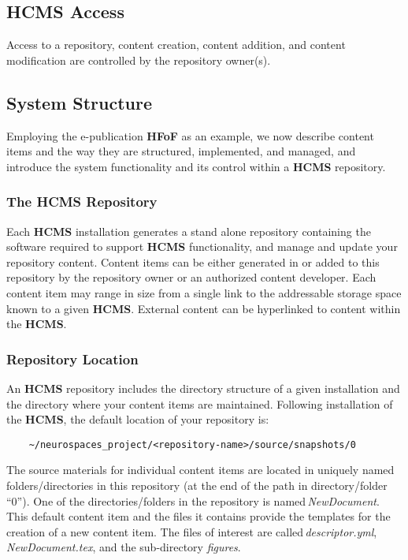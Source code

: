 \documentclass[12pt]{article}
\begin{document}
\subsection{HCMS Access}

Access to a repository, content creation, content addition, and content modification are controlled by the repository owner(s).

\subsection{System Structure}

Employing the e-publication {\bf \small HFoF} as an example, we now describe content items and the way they are structured, implemented, and managed, and introduce the system functionality and its control within a {\bf \small HCMS} repository.

\subsubsection{The HCMS Repository}

Each {\bf \small HCMS} installation generates a stand alone repository containing the software required to support {\bf \small HCMS} functionality, and manage and update your repository content. Content items can be either generated in or added to this repository by the repository owner or an authorized content developer. Each content item may range in size from a single link to the addressable storage space known to a given {\bf \small HCMS}. External content can be hyperlinked to content within the {\bf \small HCMS}.

\subsubsection{Repository Location}

An {\bf \small HCMS} repository includes the directory structure of a given installation and the directory where your content items are maintained. Following installation of the {\bf \small HCMS}, the default location of your repository is:

\begin{verbatim}
    ~/neurospaces_project/<repository-name>/source/snapshots/0
\end{verbatim}

The source materials for individual content items are located in uniquely named folders/directories in this repository (at the end of the path in directory/folder ``0''). One of the directories/folders in the repository is named\,{\it NewDocument}. This default content item and the files it contains provide the templates for the creation of a new content item. The files of interest are called\,{\it descriptor.yml}, {\it NewDocument.tex}, and the sub-directory {\it figures}.
\end{document}
